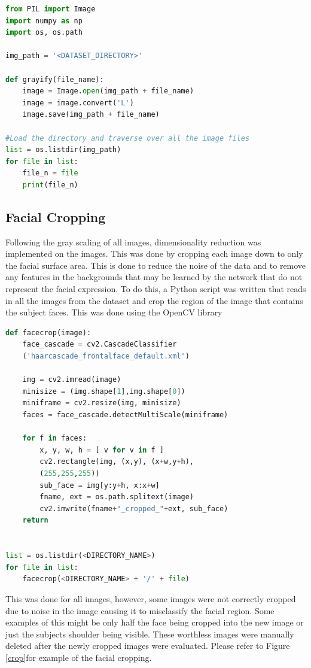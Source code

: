 \begin{lstlisting}[language=Python, frame=single]
from PIL import Image
import numpy as np
import os, os.path

img_path = '<DATASET_DIRECTORY>' 

def grayify(file_name):
	image = Image.open(img_path + file_name)
	image = image.convert('L')
	image.save(img_path + file_name)

#Load the directory and traverse over all the image files
list = os.listdir(img_path)
for file in list:
	file_n = file
	print(file_n)

\end{lstlisting}

\subsection{Facial Cropping}
Following the gray scaling of all images, dimensionality reduction was implemented on the images. This was done by cropping each image down to only the facial surface area. This is done to reduce the noise of the data and to remove any features in the backgrounds that may be learned by the network that do not represent the facial expression. To do this, a Python script was written that reads in all the images from the dataset and crop the region of the image that contains the subject faces. This was done using the OpenCV library 

\begin{lstlisting}[language=Python, frame=single]
def facecrop(image):
	face_cascade = cv2.CascadeClassifier
	('haarcascade_frontalface_default.xml')
	
	img = cv2.imread(image)
	minisize = (img.shape[1],img.shape[0])
	miniframe = cv2.resize(img, minisize)
	faces = face_cascade.detectMultiScale(miniframe)
	
	for f in faces:
		x, y, w, h = [ v for v in f ]
		cv2.rectangle(img, (x,y), (x+w,y+h),
		(255,255,255))
		sub_face = img[y:y+h, x:x+w]
		fname, ext = os.path.splitext(image)
		cv2.imwrite(fname+"_cropped_"+ext, sub_face)
	return


list = os.listdir(<DIRECTORY_NAME>)
for file in list:
	facecrop(<DIRECTORY_NAME> + '/' + file)
\end{lstlisting}

This was done for all images, however, some images were not correctly cropped due to noise in the image causing it to misclassify the facial region. Some examples of this might be only half the face being cropped into the new image or just the subjects shoulder being visible. These worthless images were manually deleted after the newly cropped images were evaluated. Please refer to Figure \ref{crop}for example of the facial cropping.

